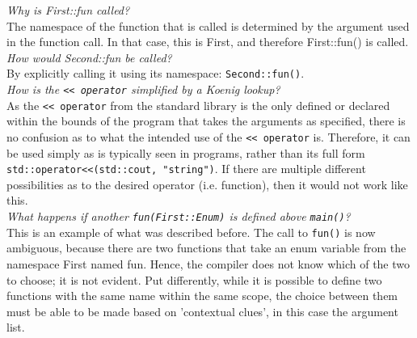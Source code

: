 


\textit{Why is First::fun called?} \\
The namespace of the function that is called is determined by the argument used in the function call. In that case, this is First, and therefore First::fun() is called. \\

\textit{How would Second::fun be called?} \\
By explicitly calling it using its namespace: \texttt{Second::fun()}. \\

\textit{How is the \texttt{<< operator} simplified by a Koenig lookup?} \\
As the \texttt{<< operator} from the standard library is the only defined or declared within the bounds of the program that takes the arguments as specified, there is no confusion as to what the intended use of the \texttt{<< operator} is. Therefore, it can be used simply as is typically seen in programs, rather than its full form \texttt{std::operator<<(std::cout, "string")}. If there are multiple different possibilities as to the desired operator (i.e. function), then it would not work like this. \\

\textit{What happens if another \texttt{fun(First::Enum)} is defined above \texttt{main()}?} \\
This is an example of what was described before. The call to \texttt{fun()} is now ambiguous, because there are two functions that take an enum variable from the namespace First named fun. Hence, the compiler does not know which of the two to choose; it is not evident.  Put differently, while it is possible to define two functions with the same name within the same scope, the choice between them must be able to be made based on 'contextual clues', in this case the argument list.
